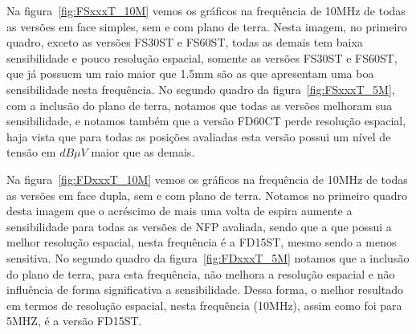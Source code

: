 Na figura~\ref{fig:FSxxxT_10M} vemos os gráficos na frequência de 10MHz de todas as versões em face simples, sem e com plano de terra. Nesta imagem, no primeiro quadro, exceto as versões FS30ST e FS60ST, todas as demais tem baixa sensibilidade e pouco resolução espacial, somente as versões FS30ST e FS60ST, que já possuem um raio maior que 1.5mm são as que apresentam uma boa sensibilidade nesta frequência. No segundo quadro da figura~\ref{fig:FSxxxT_5M}, com a inclusão do plano de terra, notamos que todas as versões melhoram sua sensibilidade, e notamos também que a versão FD60CT perde resolução espacial, haja vista que para todas as posições avaliadas esta versão possui um nível de tensão em $dB \mu V$ maior que as demais. 

Na figura~\ref{fig:FDxxxT_10M} vemos os gráficos na frequência de 10MHz de todas as versões em face dupla, sem e com plano de terra. Notamos no primeiro quadro desta imagem que o acréscimo de mais uma volta de espira aumente a sensibilidade para todas as versões de NFP avaliada, sendo que a que possui a melhor resolução espacial, nesta frequência é a FD15ST, mesmo sendo a menos sensitiva. No segundo quadro da figura~\ref{fig:FDxxxT_5M} notamos que a inclusão do plano de terra, para esta frequência, não melhora a resolução espacial e não influência de forma significativa a sensibilidade. Dessa forma, o melhor resultado em termos de resolução espacial, nesta frequência (10MHz), assim como foi para 5MHZ, é a versão FD15ST.

